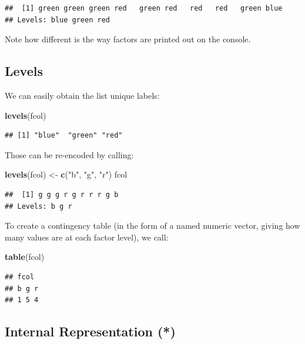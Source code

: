 \documentclass[10pt,b5paper,krantz1]{krantz}
\newenvironment{Shaded}{\begin{snugshade}}{\end{snugshade}}
\newcommand{\KeywordTok}[1]{\textcolor[rgb]{0.27,0.27,0.27}{\textbf{#1}}}
\newcommand{\NormalTok}[1]{#1}
\newcommand{\StringTok}[1]{\textcolor[rgb]{0.5,0.5,0.5}{#1}}
\begin{document}
\begin{verbatim}
##  [1] green green green red   green red   red   red   green blue 
## Levels: blue green red
\end{verbatim}

Note how different is the way factors are printed out on the console.

\hypertarget{levels}{%
\subsection{Levels}\label{levels}}

We can easily obtain the list unique labels:

\begin{Shaded}
\begin{Highlighting}[]
\KeywordTok{levels}\NormalTok{(fcol)}
\end{Highlighting}
\end{Shaded}

\begin{verbatim}
## [1] "blue"  "green" "red"
\end{verbatim}

Those can be re-encoded by calling:

\begin{Shaded}
\begin{Highlighting}[]
\KeywordTok{levels}\NormalTok{(fcol) <-}\StringTok{ }\KeywordTok{c}\NormalTok{(}\StringTok{"b"}\NormalTok{, }\StringTok{"g"}\NormalTok{, }\StringTok{"r"}\NormalTok{)}
\NormalTok{fcol}
\end{Highlighting}
\end{Shaded}

\begin{verbatim}
##  [1] g g g r g r r r g b
## Levels: b g r
\end{verbatim}

To create a contingency table (in the form of a named numeric vector,
giving how many values are at each factor level),
we call:

\begin{Shaded}
\begin{Highlighting}[]
\KeywordTok{table}\NormalTok{(fcol)}
\end{Highlighting}
\end{Shaded}

\begin{verbatim}
## fcol
## b g r 
## 1 5 4
\end{verbatim}

\hypertarget{internal-representation}{%
\subsection{Internal Representation (*)}\label{internal-representation}}
\end{document}
